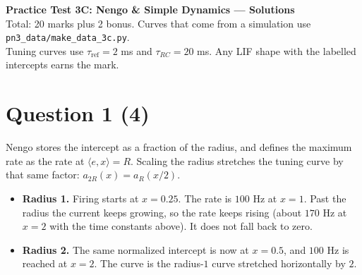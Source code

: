 \documentclass[11pt,letterpaper]{article}
\newcommand{\ans}[1]{\par\vspace{4pt}{\bfseries #1}\quad}
\begin{document}
\begin{center}
{\Large\bfseries Practice Test 3C: Nengo \& Simple Dynamics --- Solutions}\\[2pt]
Total: 20 marks plus 2 bonus. Curves that come from a simulation use \texttt{pn3\_data/make\_data\_3c.py}.\\
Tuning curves use $\tau_{\mathrm{ref}} = 2$ ms and $\tau_{RC} = 20$ ms. Any LIF shape with the labelled intercepts earns the mark.
\end{center}

\section*{Question 1 \hfill (4)}

\ans{(a) [2]}
Nengo stores the intercept as a fraction of the radius, and defines the maximum rate as the rate at $\langle e, x\rangle = R$. Scaling the radius stretches the tuning curve by that same factor: $a_{2R}(x) = a_R(x/2)$.
\begin{itemize}[leftmargin=1.2em]
\item \textbf{Radius 1.} Firing starts at $x = 0.25$. The rate is $100$ Hz at $x = 1$. Past the radius the current keeps growing, so the rate keeps rising (about $170$ Hz at $x = 2$ with the time constants above). It does not fall back to zero.
\item \textbf{Radius 2.} The same normalized intercept is now at $x = 0.5$, and $100$ Hz is reached at $x = 2$. The curve is the radius-$1$ curve stretched horizontally by $2$.
\end{itemize}
\begin{center}
\end{center}
\end{document}
